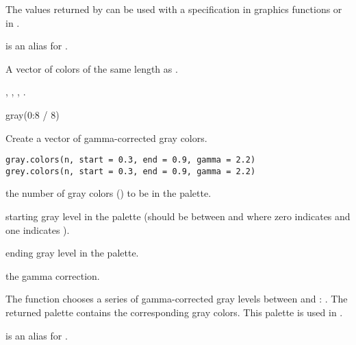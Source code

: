 %
\begin{Details}\relax
The values returned by  can be used with a 
specification in graphics functions or in .

 is an alias for .
\end{Details}
%
\begin{Value}
A vector of colors of the same length as .
\end{Value}
%
\begin{SeeAlso}\relax
{},
,
,
.
\end{SeeAlso}
%
\begin{Examples}
\begin{ExampleCode}
gray(0:8 / 8)
\end{ExampleCode}
\end{Examples}
%
\begin{Description}\relax
Create a vector of  gamma-corrected gray colors.
\end{Description}
%
\begin{Usage}
\begin{verbatim}
gray.colors(n, start = 0.3, end = 0.9, gamma = 2.2)
grey.colors(n, start = 0.3, end = 0.9, gamma = 2.2)
\end{verbatim}
\end{Usage}
%
\begin{Arguments}
\begin{ldescription}
\item[\code{n}] the number of gray colors () to be in the
palette.
\item[\code{start}] starting gray level in the palette (should be between
 and  where zero indicates  and one
indicates ).
\item[\code{end}] ending gray level in the palette.
\item[\code{gamma}] the gamma correction.
\end{ldescription}
\end{Arguments}
%
\begin{Details}\relax
The function  chooses a series of 
gamma-corrected gray levels between  and :
.
The returned palette contains the corresponding gray colors.
This palette is used in .

 is an alias for .
\end{Details}

